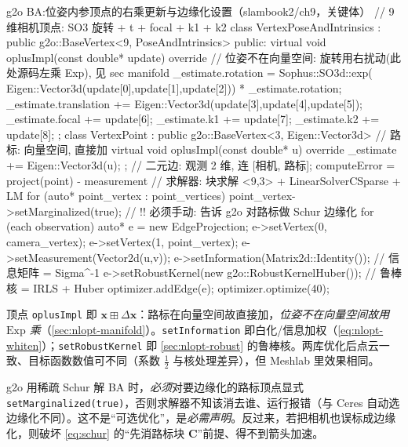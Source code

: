 \begin{codebox}[C++]{g2o BA:位姿内参顶点的右乘更新与边缘化设置（slambook2/ch9，关键体）}
// 9 维相机顶点: SO3 旋转 + t + focal + k1 + k2
class VertexPoseAndIntrinsics : public g2o::BaseVertex<9, PoseAndIntrinsics> {
public:
  virtual void oplusImpl(const double* update) override {
    // 位姿不在向量空间: 旋转用右扰动(此处源码左乘 Exp), 见 sec manifold
    _estimate.rotation = Sophus::SO3d::exp(
        Eigen::Vector3d(update[0],update[1],update[2])) * _estimate.rotation;
    _estimate.translation += Eigen::Vector3d(update[3],update[4],update[5]);
    _estimate.focal += update[6]; _estimate.k1 += update[7]; _estimate.k2 += update[8];
  }
};
class VertexPoint : public g2o::BaseVertex<3, Eigen::Vector3d> {   // 路标: 向量空间, 直接加
  virtual void oplusImpl(const double* u) override { _estimate += Eigen::Vector3d(u); }
};
// 二元边: 观测 2 维, 连 [相机, 路标]; computeError = project(point) - measurement
// 求解器: 块求解 <9,3> + LinearSolverCSparse + LM
for (auto* point_vertex : point_vertices)
  point_vertex->setMarginalized(true);     // !! 必须手动: 告诉 g2o 对路标做 Schur 边缘化
for (each observation) {
  auto* e = new EdgeProjection;
  e->setVertex(0, camera_vertex); e->setVertex(1, point_vertex);
  e->setMeasurement(Vector2d(u,v));
  e->setInformation(Matrix2d::Identity());           // 信息矩阵 = Sigma^-1
  e->setRobustKernel(new g2o::RobustKernelHuber());  // 鲁棒核 = IRLS + Huber
  optimizer.addEdge(e);
}
optimizer.optimize(40);
\end{codebox}

\noindent 顶点 \texttt{oplusImpl} 即 $\mathbf{x}\boxplus\Delta\mathbf{x}$：路标在向量空间故直接加，\emph{位姿不在向量空间故用 $\mathrm{Exp}$ 乘}（\cref{sec:nlopt-manifold}）。\texttt{setInformation} 即白化/信息加权（\cref{eq:nlopt-whiten}）；\texttt{setRobustKernel} 即 \cref{sec:nlopt-robust} 的鲁棒核。两库优化后点云一致、目标函数数值可不同（系数 $\tfrac12$ 与核处理差异），但 Meshlab 里效果相同。

\begin{pitfall}
g2o 用稀疏 Schur 解 BA 时，\emph{必须}对要边缘化的路标顶点显式 \texttt{setMarginalized(true)}，否则求解器不知该消去谁、运行报错（与 Ceres 自动选边缘化不同）。这不是“可选优化”，是\emph{必需声明}。反过来，若把相机也误标成边缘化，则破坏 \cref{eq:schur} 的“先消路标块 $\mathbf{C}$”前提、得不到箭头加速。
\end{pitfall}

